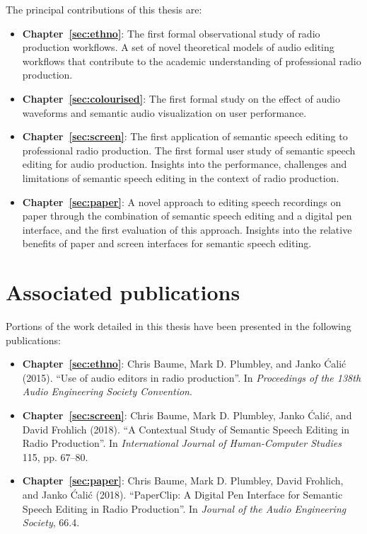 The principal contributions of this thesis are:
\begin{itemize}
  \item \textbf{Chapter~\ref{sec:ethno}}: 
    The first formal observational study of radio production workflows. A set of novel theoretical models of audio
    editing workflows that contribute to the academic understanding of professional radio production.
  \item \textbf{Chapter~\ref{sec:colourised}}: 
    The first formal study on the effect of audio waveforms and semantic audio visualization on user performance.
  \item \textbf{Chapter~\ref{sec:screen}}: 
    The first application of semantic speech editing to professional radio production.  The first formal user study of
    semantic speech editing for audio production. Insights into the performance, challenges and limitations of semantic
    speech editing in the context of radio production. 
  \item \textbf{Chapter~\ref{sec:paper}}:
    A novel approach to editing speech recordings on paper through the combination of semantic speech editing and a
    digital pen interface, and the first evaluation of this approach. Insights into the relative benefits of paper and
    screen interfaces for semantic speech editing.
\end{itemize}

\section{Associated publications}\label{sec:intro-publications}

Portions of the work detailed in this thesis have been presented in the following publications:


\nocite{Baume2015,Baume2018a,Baume2018}
\begin{itemize}
  \item \textbf{Chapter~\ref{sec:ethno}}: Chris Baume, Mark D. Plumbley, and Janko \'{C}ali\'{c} (2015). ``Use of audio
    editors in radio production''. In \textit{Proceedings of the 138th Audio Engineering Society Convention}.
  \item \textbf{Chapter~\ref{sec:screen}}: Chris Baume, Mark D. Plumbley, Janko \'{C}ali\'{c}, and David Frohlich
    (2018). ``A Contextual Study of Semantic Speech Editing in Radio Production''. In \textit{International Journal of
    Human-Computer Studies} 115, pp. 67--80.
  \item \textbf{Chapter~\ref{sec:paper}}: Chris Baume, Mark D. Plumbley, David Frohlich, and Janko \'{C}ali\'{c}
    (2018).  ``PaperClip: A Digital Pen Interface for Semantic Speech Editing in Radio Production''. In \textit{Journal
    of the Audio Engineering Society}, 66.4.   
\end{itemize}

